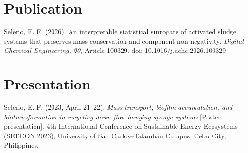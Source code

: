 \documentclass[12pt, twoside]{book}
\begin{document}
\section*{Publication}

Selerio, E. F. (2026). An interpretable statistical surrogate of activated sludge systems that preserves mass
conservation and component non-negativity. \textit{Digital Chemical Engineering, 20}, Article 100329.
doi: 10.1016/j.dche.2026.100329

\section*{Presentation}

Selerio, E. F. (2023, April 21--22). \textit{Mass transport, biofilm accumulation, and biotransformation in
recycling down-flow hanging sponge systems} [Poster presentation]. 4th International Conference on Sustainable
Energy Ecosystems (SEECON 2023), University of San Carlos--Talamban Campus, Cebu City, Philippines.
\end{document}
